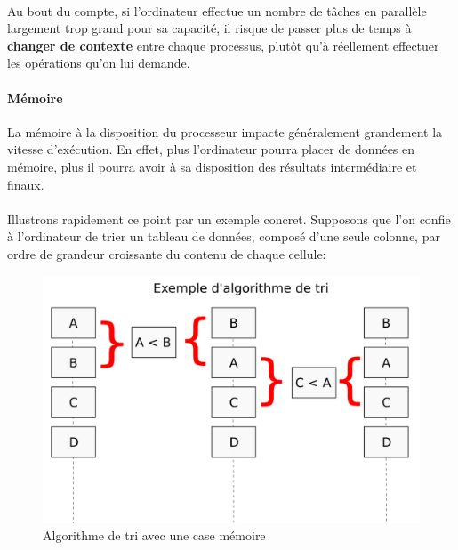 {  \paragraph{} Au bout du compte, si l'ordinateur effectue un nombre de tâches en parallèle
  largement trop grand pour sa capacité, il risque de passer plus de temps à \textbf{changer de
  contexte} entre chaque processus, plutôt qu'à réellement effectuer les opérations qu'on lui
  demande.

  \paragraph{Mémoire} La mémoire à la disposition du processeur impacte généralement grandement la
  vitesse d'exécution. En effet, plus l'ordinateur pourra placer de données en mémoire, plus il
  pourra avoir à sa disposition des résultats intermédiaire et finaux.

  \paragraph{} Illustrons rapidement ce point par un exemple concret. Supposons que l'on confie à
  l'ordinateur de trier un tableau de données, composé d'une seule colonne, par ordre de grandeur
  croissante du contenu de chaque cellule:

  \begin{figure}[h]
    \begin{center}
      \includegraphics[scale=0.3]{img/exemple-algo.png}
      \caption{Algorithme de tri avec une case mémoire}
      \label{algo-exemple}
    \end{center}
  \end{figure}

}

